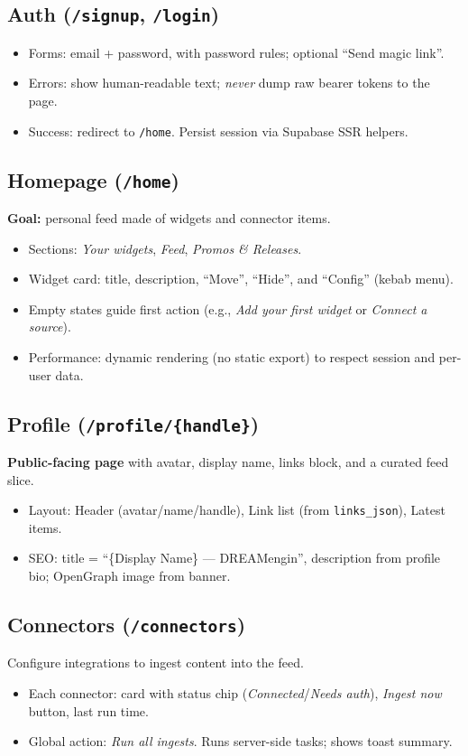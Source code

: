 \documentclass[11pt]{article}
\begin{document}
\subsection{Auth (\texttt{/signup}, \texttt{/login})}
\begin{itemize}
  \item Forms: email + password, with password rules; optional ``Send magic link''.
  \item Errors: show human-readable text; \emph{never} dump raw bearer tokens to the page.
  \item Success: redirect to \texttt{/home}. Persist session via Supabase SSR helpers.
\end{itemize}

\subsection{Homepage (\texttt{/home})}
\textbf{Goal:} personal feed made of widgets and connector items.
\begin{itemize}
  \item Sections: \emph{Your widgets}, \emph{Feed}, \emph{Promos \& Releases}.
  \item Widget card: title, description, ``Move'', ``Hide'', and ``Config'' (kebab menu).
  \item Empty states guide first action (e.g., \emph{Add your first widget} or \emph{Connect a source}).
  \item Performance: dynamic rendering (no static export) to respect session and per-user data.
\end{itemize}

\subsection{Profile (\texttt{/profile/\{handle\}})}
\textbf{Public-facing page} with avatar, display name, links block, and a curated feed slice.
\begin{itemize}
  \item Layout: Header (avatar/name/handle), Link list (from \texttt{links\_json}), Latest items.
  \item SEO: title = ``\{Display Name\} --- DREAMengin'', description from profile bio; OpenGraph image from banner.
\end{itemize}

\subsection{Connectors (\texttt{/connectors})}
Configure integrations to ingest content into the feed.
\begin{itemize}
  \item Each connector: card with status chip (\emph{Connected}/\emph{Needs auth}), \emph{Ingest now} button, last run time.
  \item Global action: \emph{Run all ingests}. Runs server-side tasks; shows toast summary.
\end{itemize}
\end{document}
